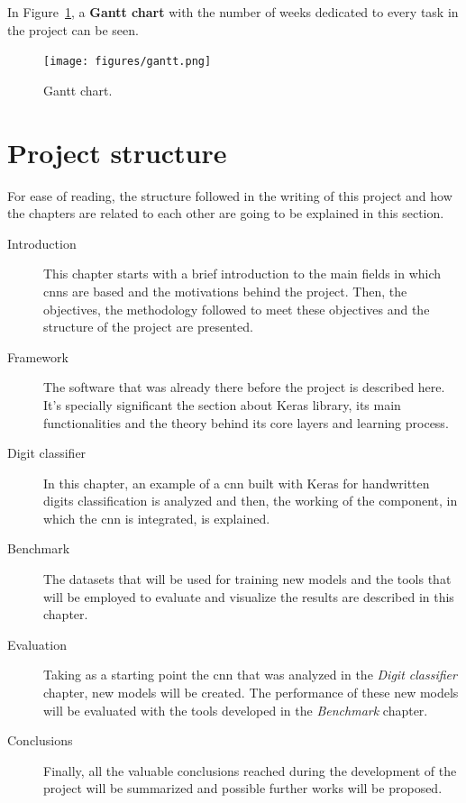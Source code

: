 In Figure~\ref{fig:gantt}, a \textbf{Gantt chart} with the number of weeks dedicated to every task in the project can be seen.
\begin{figure}
	\centering
	\texttt{[image: figures/gantt.png]}
	\caption{Gantt chart.}
	\label{fig:gantt}
\end{figure}

\section{Project structure}
For ease of reading, the structure followed in the writing of this project and how the chapters are related to each other are going to be explained in this section.

\begin{description}
	\item[Introduction] This chapter starts with a brief introduction to the main fields in which \glspl{cnn} are based and the motivations behind the project. Then, the objectives, the methodology followed to meet these objectives and the structure of the project are presented.
	\item[Framework] The software that was already there before the project is described here. It's specially significant the section about Keras library, its main functionalities and the theory behind its core layers and learning process.
	\item[Digit classifier] In this chapter, an example of a \gls{cnn} built with Keras for handwritten digits classification is analyzed and then, the working of the component, in which the \gls{cnn} is integrated, is explained.
	\item[Benchmark] The datasets that will be used for training new models and the tools that will be employed to evaluate and visualize the results are described in this chapter.
	\item[Evaluation] Taking as a starting point the \gls{cnn} that was analyzed in the \textit{Digit classifier} chapter, new models will be created. The performance of these new models will be evaluated with the tools developed in the \textit{Benchmark} chapter.
	\item[Conclusions] Finally, all the valuable conclusions reached during the development of the project will be summarized and possible further works will be proposed.
\end{description}